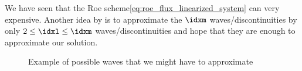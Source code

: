 \begin{sectionbox}\nospacing
    We have seen that the Roe scheme\cref{eq:roe_flux_linearized_system} can very expensive.
    Another idea by is to approximate the $\idxm$ waves/discontinuities by only $2\leq\idxl\leq\idxm$ waves/discontinuities and hope that they are enough to approximate our solution.
    \begin{figure}[H]
        \centering{
          \def\svgwidth{130pt}
          \resizebox{0.6\linewidth}{!}{
            }
        }
        \caption{Example of possible waves that we might have to approximate}
        \label{figure:euler_three_waves}
    \end{figure}
\end{sectionbox}
